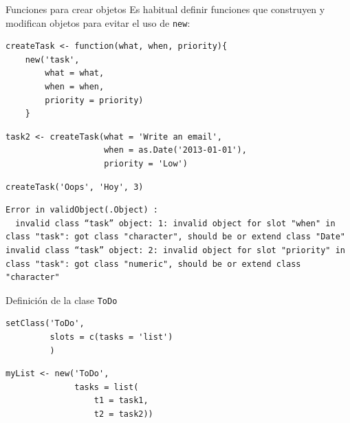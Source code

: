 \documentclass[xcolor={usenames,svgnames,dvipsnames}]{beamer}
\begin{document}
\begin{frame}[fragile,label={sec:org25e62a4}]{Funciones para crear objetos}
 Es habitual definir funciones que construyen y modifican objetos
para evitar el uso de \texttt{new}:
\lstset{language=r,label= ,caption= ,captionpos=b,numbers=none}
\begin{lstlisting}
createTask <- function(what, when, priority){
    new('task',
        what = what,
        when = when,
        priority = priority)
    }
\end{lstlisting}

\lstset{language=r,label= ,caption= ,captionpos=b,numbers=none}
\begin{lstlisting}
task2 <- createTask(what = 'Write an email',
                    when = as.Date('2013-01-01'),
                    priority = 'Low')
\end{lstlisting}

\lstset{language=r,label= ,caption= ,captionpos=b,numbers=none}
\begin{lstlisting}
createTask('Oops', 'Hoy', 3)
\end{lstlisting}

\begin{verbatim}
Error in validObject(.Object) : 
  invalid class “task” object: 1: invalid object for slot "when" in class "task": got class "character", should be or extend class "Date"
invalid class “task” object: 2: invalid object for slot "priority" in class "task": got class "numeric", should be or extend class "character"
\end{verbatim}
\end{frame}

\begin{frame}[fragile,label={sec:org3933d7e}]{Definición de la clase \texttt{ToDo}}
 \lstset{language=r,label= ,caption= ,captionpos=b,numbers=none}
\begin{lstlisting}
setClass('ToDo',
         slots = c(tasks = 'list')
         )
\end{lstlisting}

\lstset{language=r,label= ,caption= ,captionpos=b,numbers=none}
\begin{lstlisting}
myList <- new('ToDo',
              tasks = list(
                  t1 = task1,
                  t2 = task2))
\end{lstlisting}
\end{frame}
\end{document}
